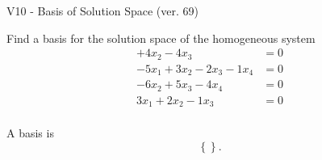 \begin{exercise}
  \begin{exerciseTitle}V10 - Basis of Solution Space (ver. 69)\end{exerciseTitle}
  \begin{exerciseStatement}
    Find a basis for the solution space of the homogeneous system 
\begin{align*}
 + 4 x_ 2 -4 x_ 3 &= 0  \\ 
  -5 x_ 1 + 3 x_ 2 -2 x_ 3 -1 x_ 4 &= 0  \\ 
  -6 x_ 2 + 5 x_ 3 -4 x_ 4 &= 0  \\ 
  3 x_ 1 + 2 x_ 2 -1 x_ 3 &= 0  \\ 
 \end{align*}


 
  \end{exerciseStatement}

  \begin{exerciseAnswer}
   A basis is   
\[\left\{\right\}.\]

  


  \end{exerciseAnswer}
\end{exercise}